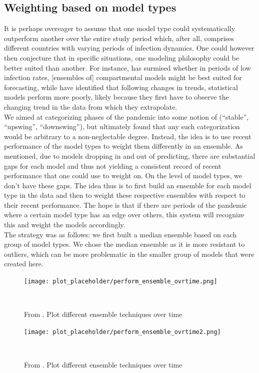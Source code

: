 \subsection{Weighting based on model types}
It is perhaps overeager to assume that one model type could systematically outperform another over the entire study period which, after all, comprises different countries with varying periods of infection dynamics. One could however then conjecture that in specific situations, one modeling philosophy could be better suited than another. For instance, \citep{taylor_combining_2021} has surmised whether in periods of low infection rates, [ensembles of] compartmental models might be best suited for forecasting, while \citep{bracher_pre-registered_2021} have identified that following changes in trends, statistical models perform more poorly, likely because they first have to observe the changing trend in the data from which they extrapolate.\\
We aimed at categorizing phases of the pandemic into some notion of (``stable'', ``upswing'', ``downswing''), but ultimately found that any such categorization would be arbitrary to a non-neglectable degree. Instead, the idea is to use recent performance of the model types to weight them differently in an ensemble. As mentioned, due to models dropping in and out of predicting, there are substantial gaps for each model and thus not yielding a consistent record of recent performance that one could use to weight on. On the level of model types, we don't have these gaps. The idea thus is to first build an ensemble for each model type in the data and then to weight these respective ensembles with respect to their recent performance. The hope is that if there are periods of the pandemic where a certain model type has an edge over others, this system will recognize this and weight the models accordingly. \\
The strategy was as follows: we first built a median ensemble based on each group of model types. We chose the median ensemble as it is more resistant to outliers, which can be more problematic in the smaller group of models that were created here.
\begin{figure}
\centering
\texttt{[image: plot\_placeholder/perform\_ensemble\_ovrtime.png]}
\caption{From \cite{ray_ensemble_2020}. Plot different ensemble techniques over time}
\
\end{figure}
\begin{figure}
\centering
\texttt{[image: plot\_placeholder/perform\_ensemble\_ovrtime2.png]}
\caption{From \cite{ray_ensemble_2020}. Plot different ensemble techniques over time}
\
\end{figure}


